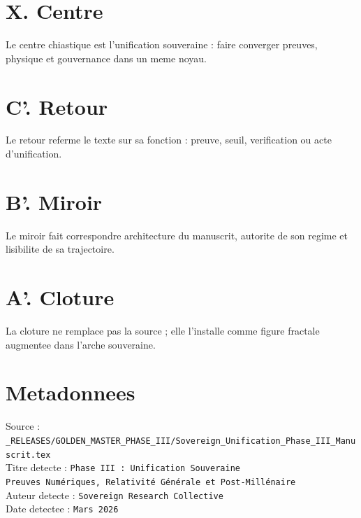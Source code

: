 \documentclass[11pt,a4paper]{article}
\begin{document}
\section*{X. Centre}
Le centre chiastique est l'unification souveraine : faire converger preuves, physique et gouvernance dans un meme noyau.

\section*{C'. Retour}
Le retour referme le texte sur sa fonction : preuve, seuil, verification ou acte d'unification.

\section*{B'. Miroir}
Le miroir fait correspondre architecture du manuscrit, autorite de son regime et lisibilite de sa trajectoire.

\section*{A'. Cloture}
La cloture ne remplace pas la source ; elle l'installe comme figure fractale augmentee dans l'arche souveraine.

\section*{Metadonnees}
Source : \texttt{_RELEASES/GOLDEN_MASTER_PHASE_III/Sovereign_Unification_Phase_III_Manuscrit.tex}\\
Titre detecte : \texttt{Phase III : Unification Souveraine \\ Preuves Numériques, Relativité Générale et Post-Millénaire}\\
Auteur detecte : \texttt{Sovereign Research Collective}\\
Date detectee : \texttt{Mars 2026}
\end{document}
